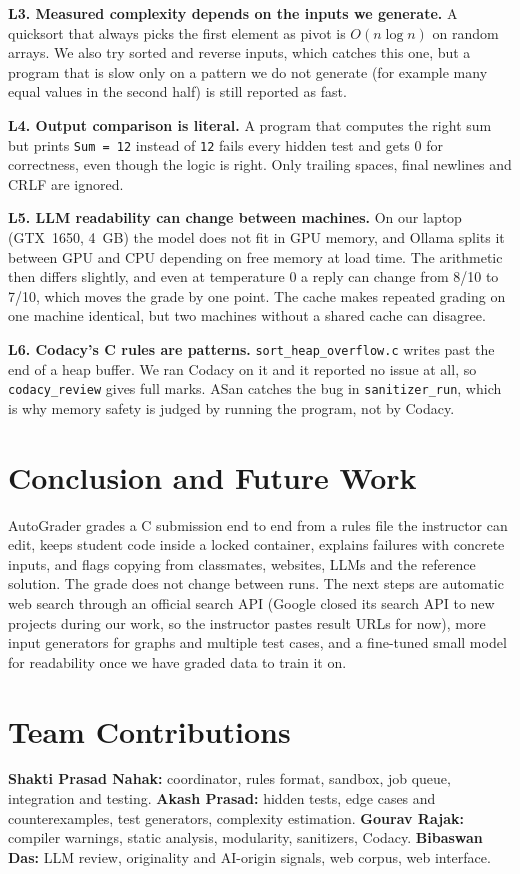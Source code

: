 \documentclass[conference]{IEEEtran}
\newcommand{\code}[1]{\texttt{#1}}
\begin{document}
\textbf{L3. Measured complexity depends on the inputs we generate.} A quicksort that always
picks the first element as pivot is $O(n\log n)$ on random arrays. We also try sorted and
reverse inputs, which catches this one, but a program that is slow only on a pattern we do not
generate (for example many equal values in the second half) is still reported as fast.

\textbf{L4. Output comparison is literal.} A program that computes the right sum but prints
\code{Sum = 12} instead of \code{12} fails every hidden test and gets 0 for correctness, even
though the logic is right. Only trailing spaces, final newlines and CRLF are ignored.

\textbf{L5. LLM readability can change between machines.} On our laptop (GTX~1650, 4~GB) the
model does not fit in GPU memory, and Ollama splits it between GPU and CPU depending on free
memory at load time. The arithmetic then differs slightly, and even at temperature 0 a reply can
change from 8/10 to 7/10, which moves the grade by one point. The cache makes repeated grading
on one machine identical, but two machines without a shared cache can disagree.

\textbf{L6. Codacy's C rules are patterns.} \code{sort\_heap\_overflow.c} writes past the end
of a heap buffer. We ran Codacy on it and it reported no issue at all, so \code{codacy\_review} gives full marks.
ASan catches the bug in \code{sanitizer\_run}, which is why memory safety is judged by running
the program, not by Codacy.

\section{Conclusion and Future Work}
AutoGrader grades a C submission end to end from a rules file the instructor can edit, keeps
student code inside a locked container, explains failures with concrete inputs, and flags
copying from classmates, websites, LLMs and the reference solution. The grade does not change
between runs. The next steps are automatic web search through an official search API (Google
closed its search API to new projects during our work, so the instructor pastes result URLs for
now), more input generators for graphs and multiple test cases, and a fine-tuned small model
for readability once we have graded data to train it on.

\section*{Team Contributions}
\textbf{Shakti Prasad Nahak:} coordinator, rules format, sandbox, job queue, integration and
testing. \textbf{Akash Prasad:} hidden tests, edge cases and counterexamples, test generators,
complexity estimation. \textbf{Gourav Rajak:} compiler warnings, static analysis, modularity,
sanitizers, Codacy. \textbf{Bibaswan Das:} LLM review, originality and AI-origin signals, web
corpus, web interface.
\end{document}
